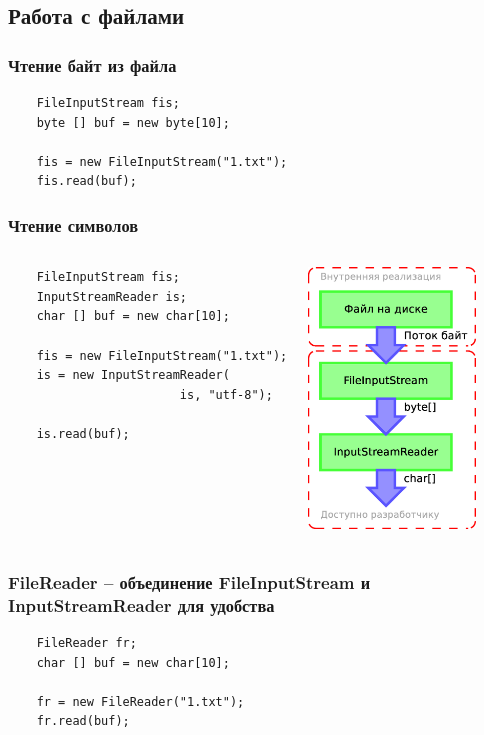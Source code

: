 \subsection{Работа с файлами}
\begin{frame}[fragile]
	\frametitle{Чтение байт из файла}

	\begin{Large}
	\begin{verbatim}
	FileInputStream fis;
	byte [] buf = new byte[10];

	fis = new FileInputStream("1.txt");
	fis.read(buf);
	\end{verbatim}
	\end{Large}
\end{frame}

\begin{frame}[fragile]
	\frametitle{Чтение символов}

	\begin{columns}[c]
	\column{2.8in}
	\begin{verbatim}
	FileInputStream fis;
	InputStreamReader is;
	char [] buf = new char[10];

	fis = new FileInputStream("1.txt");
	is = new InputStreamReader(
	                    is, "utf-8");

	is.read(buf);
	\end{verbatim}
	\column{1.7in}
	\includegraphics[width=1.75in]{lesson-3-Diagram1.eps}
	\end{columns}
\end{frame}

\begin{frame}[fragile]
	\frametitle{FileReader -- объединение FileInputStream и InputStreamReader для удобства}

	\begin{Large}
	
	\begin{verbatim}
	FileReader fr;
	char [] buf = new char[10];

	fr = new FileReader("1.txt");
	fr.read(buf);
	\end{verbatim}
	\end{Large}
\end{frame}

